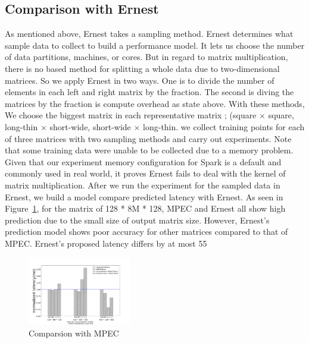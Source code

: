 \documentclass[10pt, conference, compsocconf]{IEEEtran}
\begin{document}
\subsection{Comparison with Ernest}
As mentioned above, Ernest takes a sampling method. Ernest determines what sample data to collect to build a performance model. It lets us choose the number of data partitions, machines, or cores. But in regard to matrix multiplication, there is no based method for splitting a whole data due to two-dimensional matrices. So we apply Ernest in two ways. One is to divide the number of elements in each left and right matrix by the fraction. The second is diving the matrices by the fraction is compute overhead as state above. With these methods, We choose the biggest matrix in each representative matrix ; (square $\times$ square, long-thin $\times$ short-wide, short-wide $\times$ long-thin. we collect training points for each of three matrices with two sampling methods and carry out experiments. Note that some training data were unable to be collected due to a memory problem. Given that our experiment memory configuration for Spark is a default and commonly used in real world, it proves Ernest fails to deal with the kernel of matrix multiplication.  After we run the experiment for the sampled data in Ernest, we build a model compare predicted latency with Ernest.  As seen in Figure~\ref{fig:mpc-ernest}, for the matrix of 128 * 8M * 128, MPEC and Ernest all show high prediction due to the small size of output matrix size. However, Ernest's prediction model shows poor accuracy for other matrices compared to that of MPEC. Ernest's proposed latency differs by at most 55%

\begin{figure}[t]
	\centering\includegraphics[width=0.4\textwidth]{figures/MPC-Ernest-compare.pdf}\caption{Comparsion with MPEC}\label{fig:mpc-ernest}
\end{figure}
\end{document}
